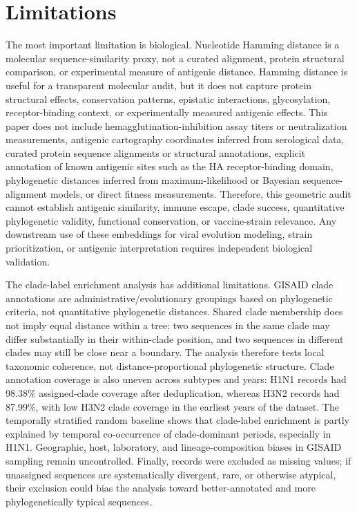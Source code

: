 \documentclass[11pt]{article}
\begin{document}
\section{Limitations}

The most important limitation is biological. Nucleotide Hamming distance is a molecular sequence-similarity proxy, not a curated alignment, protein structural comparison, or experimental measure of antigenic distance. Hamming distance is useful for a transparent molecular audit, but it does not capture protein structural effects, conservation patterns, epistatic interactions, glycosylation, receptor-binding context, or experimentally measured antigenic effects. This paper does not include hemagglutination-inhibition assay titers or neutralization measurements, antigenic cartography coordinates inferred from serological data, curated protein sequence alignments or structural annotations, explicit annotation of known antigenic sites such as the HA receptor-binding domain, phylogenetic distances inferred from maximum-likelihood or Bayesian sequence-alignment models, or direct fitness measurements. Therefore, this geometric audit cannot establish antigenic similarity, immune escape, clade success, quantitative phylogenetic validity, functional conservation, or vaccine-strain relevance. Any downstream use of these embeddings for viral evolution modeling, strain prioritization, or antigenic interpretation requires independent biological validation.

The clade-label enrichment analysis has additional limitations. GISAID clade annotations are administrative/evolutionary groupings based on phylogenetic criteria, not quantitative phylogenetic distances. Shared clade membership does not imply equal distance within a tree: two sequences in the same clade may differ substantially in their within-clade position, and two sequences in different clades may still be close near a boundary. The analysis therefore tests local taxonomic coherence, not distance-proportional phylogenetic structure. Clade annotation coverage is also uneven across subtypes and years: H1N1 records had 98.38\% assigned-clade coverage after deduplication, whereas H3N2 records had 87.99\%, with low H3N2 clade coverage in the earliest years of the dataset. The temporally stratified random baseline shows that clade-label enrichment is partly explained by temporal co-occurrence of clade-dominant periods, especially in H1N1. Geographic, host, laboratory, and lineage-composition biases in GISAID sampling remain uncontrolled. Finally,  records were excluded as missing values; if unassigned sequences are systematically divergent, rare, or otherwise atypical, their exclusion could bias the analysis toward better-annotated and more phylogenetically typical sequences.
\end{document}
